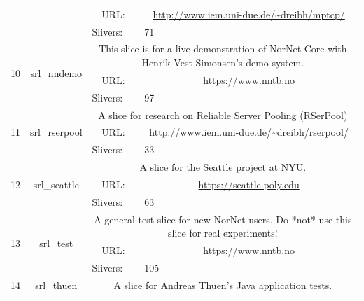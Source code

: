 \begin{small}
\begin{center}
\begin{longtable}{|c|c|c|c|}
  &  & \multicolumn{1}{|p{5em}|}{URL:} & \multicolumn{1}{|p{22.5em}|}{\url{http://www.iem.uni-due.de/~dreibh/mptcp/}} \\* \cline{3-3}\cline{4-4}
  &  & \multicolumn{1}{|l|}{Slivers:} & \multicolumn{1}{|l|}{71} \\ \hline
 \multirow{3}{*}{10} & \multirow{3}{*}{\index{srl\_nndemo}\index{Slice!srl\_nndemo}srl\_nndemo} & \multicolumn{2}{|p{30em}|}{This slice is for a live demonstration of NorNet Core with Henrik Vest Simonsen's demo system.} \\* \cline{3-3}\cline{4-4}
  &  & \multicolumn{1}{|p{5em}|}{URL:} & \multicolumn{1}{|p{22.5em}|}{\url{https://www.nntb.no}} \\* \cline{3-3}\cline{4-4}
  &  & \multicolumn{1}{|l|}{Slivers:} & \multicolumn{1}{|l|}{97} \\ \hline
 \multirow{3}{*}{11} & \multirow{3}{*}{\index{srl\_rserpool}\index{Slice!srl\_rserpool}srl\_rserpool} & \multicolumn{2}{|p{30em}|}{A slice for research on Reliable Server Pooling (RSerPool)} \\* \cline{3-3}\cline{4-4}
  &  & \multicolumn{1}{|p{5em}|}{URL:} & \multicolumn{1}{|p{22.5em}|}{\url{http://www.iem.uni-due.de/~dreibh/rserpool/}} \\* \cline{3-3}\cline{4-4}
  &  & \multicolumn{1}{|l|}{Slivers:} & \multicolumn{1}{|l|}{33} \\ \hline
 \multirow{3}{*}{12} & \multirow{3}{*}{\index{srl\_seattle}\index{Slice!srl\_seattle}srl\_seattle} & \multicolumn{2}{|p{30em}|}{A slice for the Seattle project at NYU.} \\* \cline{3-3}\cline{4-4}
  &  & \multicolumn{1}{|p{5em}|}{URL:} & \multicolumn{1}{|p{22.5em}|}{\url{https://seattle.poly.edu}} \\* \cline{3-3}\cline{4-4}
  &  & \multicolumn{1}{|l|}{Slivers:} & \multicolumn{1}{|l|}{63} \\ \hline
 \multirow{3}{*}{13} & \multirow{3}{*}{\index{srl\_test}\index{Slice!srl\_test}srl\_test} & \multicolumn{2}{|p{30em}|}{A general test slice for new NorNet users. Do *not* use this slice for real experiments!} \\* \cline{3-3}\cline{4-4}
  &  & \multicolumn{1}{|p{5em}|}{URL:} & \multicolumn{1}{|p{22.5em}|}{\url{https://www.nntb.no}} \\* \cline{3-3}\cline{4-4}
  &  & \multicolumn{1}{|l|}{Slivers:} & \multicolumn{1}{|l|}{105} \\ \hline
 \multirow{3}{*}{14} & \multirow{3}{*}{\index{srl\_thuen}\index{Slice!srl\_thuen}srl\_thuen} & \multicolumn{2}{|p{30em}|}{A slice for Andreas Thuen's Java application tests.} \\* \cline{3-3}\cline{4-4}

\end{longtable}
\end{center}
\end{small}
